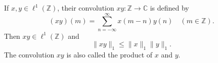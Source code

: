 If $x, y \in \ell^1(\mathbb{Z})$, their convolution $xy: \mathbb{Z} \to \mathbb{C}$ is defined by
$$(xy)(m) = \sum_{n=-\infty}^{\infty} x(m-n) y(n) \quad (m \in \mathbb{Z}).$$
Then $xy \in \ell^1(\mathbb{Z})$ and
$$\|xy\|_1 \leq \|x\|_1 \|y\|_1.$$
The convolution $xy$ is also called the product of $x$ and $y$.
